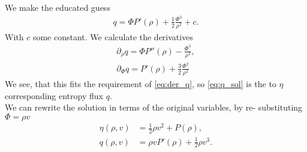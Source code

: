 We make the educated guess 
\begin{align}
q=\Phi P'(\rho) +\frac 12 \frac{\Phi^3}{\rho^2} +c.\label{eq:q_sol}
\end{align}
With $c$ some constant.
We calculate the derivatives 
\begin{align}
\partial_\rho q = \Phi P''(\rho) - \frac{\Phi^3}{\rho^3},\\
\partial_\Phi q = P'(\rho) +\frac 32 \frac{\Phi^2}{\rho^2}
\end{align}
We see, that this fits the requirement of \cref{eq:der_q}, so \cref{eq:q_sol} is the to $\eta$ corresponding entropy flux $q$.
\\We can rewrite the solution in terms of the original variables, by re- substituting $\Phi=\rho v$
\begin{align}
\eta(\rho,v)&=\frac 12 \rho v^2 +P(\rho),\\
 q(\rho,v)&= \rho v P'(\rho) + \frac 12 \rho v^3.
\end{align}